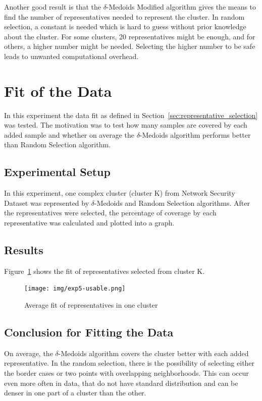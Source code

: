 \documentclass[thesis=B,english]{FITthesis}[2012/10/20]
\begin{document}
Another good result is that the $\delta$-Medoids Modified algorithm gives the means to find the number of representatives needed to represent the cluster.
In random selection, a constant is needed which is hard to guess without prior knowledge about the cluster.
For some clusters, 20 representatives might be enough, and for others, a higher number might be needed.
Selecting the higher number to be safe leads to unwanted computational overhead.

\section{Fit of the Data}\label{sec:exp5}

In this experiment the data fit as defined in Section~\ref{sec:representative_selection} was tested.
The motivation was to test how many samples are covered by each added sample and whether on average the $\delta$-Medoids algorithm performs better than Random Selection algorithm.

\subsection{Experimental Setup}
In this experiment, one complex cluster (cluster K) from Network Security Dataset was represented by $\delta$-Medoids and Random Selection algorithms.
After the representatives were selected, the percentage of coverage by each representative was calculated and plotted into a graph.

\subsection{Results}
Figure~\ref{img:exp5} shows the fit of representatives selected from cluster K.

\begin{figure}[t]
  \texttt{[image: img/exp5-usable.png]}
  \caption{Average fit of representatives in one cluster}
  \label{img:exp5}
\end{figure}

\subsection{Conclusion for Fitting the Data}
On average, the $\delta$-Medoids algorithm covers the cluster better with each added representative.
In the random selection, there is the possibility of selecting either the border cases or two points with overlapping neighborhoods.
This can occur even more often in data, that do not have standard distribution and can be denser in one part of a cluster than the other.
\end{document}
